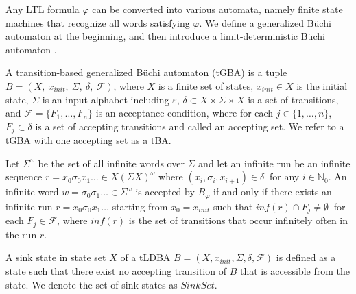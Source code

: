 \begin{definition}
\label{def5}
\end{definition}

Any LTL formula $\varphi$ can be converted into various automata, namely finite state machines that recognize %
all words satisfying $\varphi$.
 We define a generalized B\"{u}chi automaton at the beginning, and then introduce a limit-deterministic B\"{u}chi automaton \cite{HKAKPL2019}.

 \begin{definition}
   A transition-based generalized B\"{u}chi automaton (tGBA) is a tuple $B = (X,\ x_{init},\ \Sigma,\ \delta,\ \mathcal{F})$, where $X$ is a finite set of states, $x_{init} \in X$ is the initial state, $\Sigma$ is an input alphabet including $\varepsilon$, $\delta \subset  X\times \Sigma \times X$ is a set of transitions, and $\mathcal{F} = \{F_1,\ldots,F_n\}$ is an acceptance condition, where for each $ j \in \{1,\ldots,n\}$, $F_j \subset \delta$ is a set of accepting transitions and called an accepting set. We refer to a tGBA with one accepting set as a tBA.

   Let $\Sigma^{\omega}$ be the set of all infinite words over $\Sigma$ and let an infinite run be an infinite sequence $r = x_0\sigma_0x_1 \ldots \in X (\Sigma X)^{\omega}$ where $(x_i, \sigma_{i}, x_{i+1}) \in \delta\ $ for any $ i\in \mathbb{N}_0$. An infinite word $w = \sigma_0\sigma_1 \ldots \in \Sigma^{\omega}$ is accepted by $B_{\varphi}$ if and only if there exists an infinite run $r = x_0 \sigma_0 x_1 \ldots$ starting from $x_0 = x_{init}$ such that $inf(r) \cap F_j \neq \emptyset\ $ for each $F_j \in \mathcal{F}$, where $inf(r)$ is the set of transitions that occur infinitely often in the run $r$.
 \end{definition}

\begin{definition}
A sink state in state set $X$ of a tLDBA $B = (X, x_{init}, \Sigma, \delta, \mathcal{F})$ is defined as a state such that there exist no accepting transition of $B$ that is accessible from the state. We denote the set of sink states as $Sink Set$.
\end{definition}

